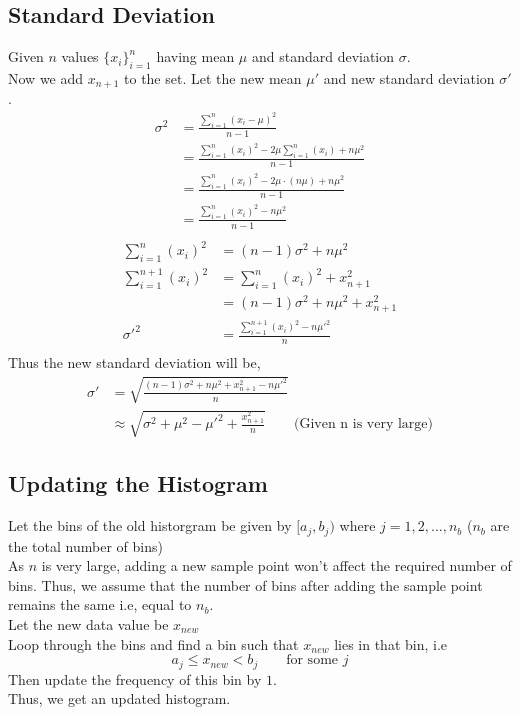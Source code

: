 \documentclass[11pt]{article}
\begin{document}
\subsection*{Standard Deviation}
Given $n$ values $\{x_i\}^n_{i=1}$ having mean $\mu$ and standard deviation $\sigma$. \\
Now we add $x_{n+1}$ to the set. Let the new mean $\mu'$ and new standard deviation $\sigma'$. \\
\begin{equation*}
    \begin{split}
        \sigma^2 &= \frac{\sum_{i=1}^{n} (x_i - \mu)^2}{n-1} \\
            &= \frac{\sum_{i=1}^{n} (x_i)^2 - 2\mu\sum_{i=1}^{n} (x_i) + n\mu^2 }{n-1} \\
            &= \frac{\sum_{i=1}^{n} (x_i)^2 - 2\mu\cdot(n\mu) + n{\mu}^2}{n-1} \\
            &= \frac{\sum_{i=1}^{n} (x_i)^2 - n{\mu}^2}{n-1} \\
    \end{split}
\end{equation*}
\begin{equation*}
    \begin{split}
        \sum_{i=1}^{n} (x_i)^2 &= (n-1)\sigma^2 + n{\mu}^2 \\
        \sum_{i=1}^{n+1} (x_i)^2 &= \sum_{i=1}^{n} (x_i)^2 + x_{n+1}^2 \\
            &= (n-1)\sigma^2 + n{\mu}^2 + x_{n+1}^2 \\
        \sigma'^2 &= \frac{\sum_{i=1}^{n+1} (x_i)^2 - n{\mu'}^2}{n} \\
    \end{split}
\end{equation*}
Thus the new standard deviation will be,
$$
    \begin{aligned}
        \sigma' &= \sqrt{\frac{(n-1)\sigma^2 + n{\mu}^2 + x_{n+1}^2 - n{\mu'}^2}{n}}\\
        &\approx \sqrt{\sigma^2 + \mu^2 - \mu'^2 + \frac{x_{n+1}^2}{n}} \hspace{2em} \text{(Given n is very large)}
    \end{aligned}
$$

\subsection*{Updating the Histogram}
Let the bins of the old historgram be given by $[a_j, b_j)$ where $j = 1,2,\ldots,n_b$ ($n_b$ are the total number of bins)\\
As $n$ is very large, adding a new sample point won't affect the required number of bins. Thus, we assume that the number of bins after adding the sample point remains the same i.e, equal to $n_b$.\\
Let the new data value be $x_{new}$\\
Loop through the bins and find a bin such that $x_{new}$ lies in that bin, i.e\\
$$ a_j \le x_{new} < b_j \hspace{2em} \text{for some } j$$
Then update the frequency of this bin by $1$.\\
Thus, we get an updated histogram.\\ 
\end{document}
